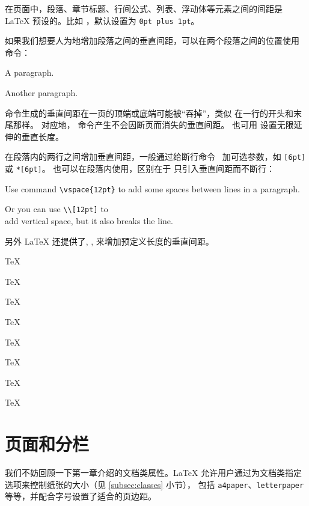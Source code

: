 在页面中，段落、章节标题、行间公式、列表、浮动体等元素之间的间距是 \LaTeX{} 预设的。比如  ，默认设置为 \texttt{0pt plus 1pt}。

如果我们想要人为地增加段落之间的垂直间距，可以在两个段落之间的位置使用  命令：
\begin{example}
A paragraph.

\vspace{2ex}
Another paragraph.
\end{example}

 命令生成的垂直间距在一页的顶端或底端可能被“吞掉”，类似  在一行的开头和末尾那样。
对应地， 命令产生不会因断页而消失的垂直间距。 也可用  设置无限延伸的垂直长度。

在段落内的两行之间增加垂直间距，一般通过给断行命令 \crcmd\ 加可选参数，如 \crcmd\texttt{[6pt]} 或 \crcmd\texttt{*[6pt]}。
 也可以在段落内使用，区别在于  只引入垂直间距而不断行：
\begin{example}
Use command \verb|\vspace{12pt}|
to add \vspace{12pt} some spaces
between lines in a paragraph.

Or you can use \verb|\\[12pt]|
to \\[12pt] add vertical space,
but it also breaks the line.
\end{example}

另外 \LaTeX{} 还提供了, ,  来增加预定义长度的垂直间距。
\begin{example}
\parbox[t]{3em}{TeX\par TeX}
\parbox[t]{3em}{TeX\par\smallskip TeX}
\parbox[t]{3em}{TeX\par\medskip TeX}
\parbox[t]{3em}{TeX\par\bigskip TeX}
\end{example}

\section{页面和分栏}\label{sec:page-columns}

我们不妨回顾一下第一章介绍的文档类属性。\LaTeX{} 允许用户通过为文档类指定选项来控制纸张的大小（见 \ref{subsec:classes} 小节），
包括 \texttt{a4paper}、\texttt{letterpaper}等等，并配合字号设置了适合的页边距。

